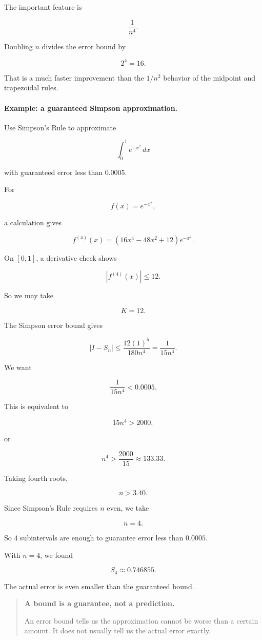 The important feature is

\[
\frac{1}{n^4}.
\]

Doubling \(n\) divides the error bound by

\[
2^4=16.
\]

That is a much faster improvement than the \(1/n^2\) behavior of the midpoint and
trapezoidal rules.

\paragraph{Example: a guaranteed Simpson approximation.}
Use Simpson's Rule to approximate

\[
\int_0^1 e^{-x^2}\,dx
\]

with guaranteed error less than \(0.0005\).

For

\[
f(x)=e^{-x^2},
\]

a calculation gives

\[
f^{(4)}(x)=\left(16x^4-48x^2+12\right)e^{-x^2}.
\]

On \([0,1]\), a derivative check shows

\[
|f^{(4)}(x)|\le 12.
\]

So we may take

\[
K=12.
\]

The Simpson error bound gives

\[
|I-S_n|
\le
\frac{12(1)^5}{180n^4}
=
\frac{1}{15n^4}.
\]

We want

\[
\frac{1}{15n^4}<0.0005.
\]

This is equivalent to

\[
15n^4>2000,
\]

or

\[
n^4>\frac{2000}{15}\approx 133.33.
\]

Taking fourth roots,

\[
n>3.40.
\]

Since Simpson's Rule requires \(n\) even, we take

\[
\boxed{n=4.}
\]

So \(4\) subintervals are enough to guarantee error less than \(0.0005\).

With \(n=4\), we found

\[
S_4\approx0.746855.
\]

The actual error is even smaller than the guaranteed bound.

\begin{quote}
\textbf{A bound is a guarantee, not a prediction.}

An error bound tells us the approximation cannot be worse than a certain amount.
It does not usually tell us the actual error exactly.
\end{quote}

